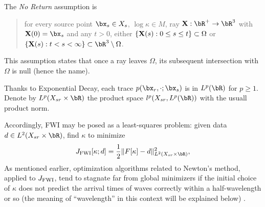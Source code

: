 The {\em No Return} assumption is
\begin{quote}
  for every source point $\bx_s \in X_{s}$, $\log \kappa \in M$, ray ${\bf X}:\bR^+\rightarrow \bR^3$
  with ${\bf X}(0)=\bx_s$ and any $t>0$, either $\{{\bf X}(s): 0\le s \le t\} \subset \Omega$
  or $\{{\bf X}(s): t < s < \infty\} \subset \bR^3 \setminus \Omega$.
\end{quote}
This assumption states that once a ray leaves
$\Omega$, its subsequent intersection with $\Omega$ is null (hence the name).

Thanks to Exponential Decay, each trace $p(\bx_r,\cdot;\bx_s)$ is in $L^{p}(\bR)$ for $p
\ge 1$.
Denote by $L^p(X_{sr} \times \bR)$ the product space $l^p(X_{sr},L^p(\bR))$
with the usuall product norm. 

Accordingly, FWI may be posed as a least-squares
problem: given data $d \in
L^2(X_{sr}\times \bR)$, find $\kappa$ to minimize
\begin{equation}
  \label{eqn:fwi}
  J_{\rm FWI}[\kappa;d]= \frac{1}{2}\|F[\kappa]-d\|^2_{L^2(X_{sr} \times \bR)},
\end{equation}
As mentioned earlier, optimization algorithms related to Newton's method, applied to
$J_{\rm FWI}$, tend to stagnate far from global minimizers if
the initial choice of $\kappa$ does not predict the arrival times of
waves correctly within a half-wavelength or so (the meaning of
``wavelength'' in this context will be explained below)
\cite[]{GauTarVir:86,VirieuxOperto:09}.

